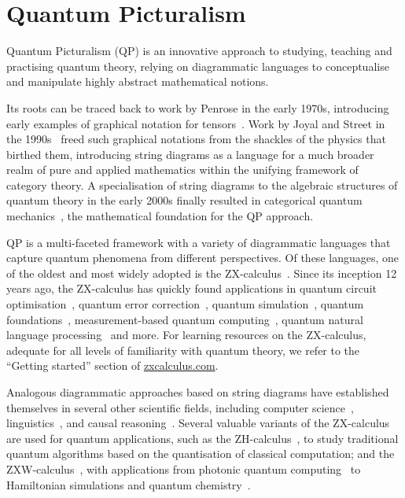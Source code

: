 \section{Quantum Picturalism}
\label{sec:QP}

Quantum Picturalism (QP) is an innovative approach to studying, teaching and practising quantum theory, relying on diagrammatic languages to conceptualise and manipulate highly abstract mathematical notions.

Its roots can be traced back to work by Penrose in the early 1970s, introducing early examples of graphical notation for tensors~\cite{Penrose}.
Work by Joyal and Street in the 1990s~\cite{JS} freed such graphical notations from the shackles of the physics that birthed them, introducing string diagrams as a language for a much broader realm of pure and applied mathematics within the unifying framework of category theory.
A specialisation of string diagrams to the algebraic structures of quantum theory in the early 2000s finally resulted in categorical quantum mechanics~\cite{abramsky2004categorical,coecke2006kindergarten,abramsky2009categorical}, the mathematical foundation for the QP approach.

QP is a multi-faceted framework with a variety of diagrammatic languages that capture quantum phenomena from different perspectives.
Of these languages, one of the oldest and most widely adopted is the ZX-calculus~\cite{coecke2011interacting}. Since its inception 12 years ago, the ZX-calculus has quickly found applications in quantum circuit optimisation~\cite{duncan2020graph, de2020fast, de2019techniques, kissinger2019reducing}, quantum error correction~\cite{huang2023qeczx, de2020zx, kissinger2022phase, khesinGraphicalQuantumCliffordencoder2023}, quantum simulation~\cite{kissinger2022classical}, quantum foundations~\cite{coecke2011phase, backens2016complete, gogioso2019dynamics, gogioso2017mermin}, measurement-based quantum computing~\cite{coecke2008interacting, duncan2009graph, kissinger2019universal}, quantum natural language processing~\cite{QPL-QNLP, lorenz2021qnlp, coecke2020foundations} and more. For learning resources on the ZX-calculus, adequate for all levels of familiarity with quantum theory, we refer to the ``Getting started'' section of \href{https://zxcalculus.com/#introPublications}{zxcalculus.com}.

Analogous diagrammatic approaches based on string diagrams have established themselves in several other scientific fields, including computer science~\cite{bonchi2014categorical}, linguistics~\cite{sadrzadeh2013frobenius, wang2023distilling}, and causal reasoning~\cite{lorenz2023causal}.
Several valuable variants of the ZX-calculus are used for quantum applications, such as the ZH-calculus~\cite{backens2018zh}, to study traditional quantum algorithms based on the quantisation of classical computation; and the ZXW-calculus~\cite{poor2023completeness}, with applications from photonic quantum computing~\cite{defelicelightmatterZXW} to Hamiltonian simulations and quantum chemistry~\cite{shaikh2022sum}.

